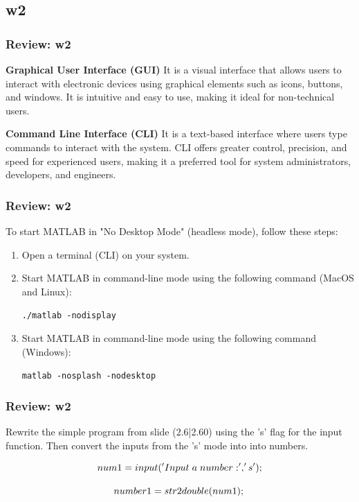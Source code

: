 \documentclass[
	11pt, %
]{beamer}
\begin{document}

\subsection{w2}

\begin{frame}
	\frametitle{Review: w2}

\textbf{Graphical User Interface (GUI)}
It is a visual interface that allows users to interact with electronic devices using graphical elements such as icons, buttons, and windows. It is intuitive and easy to use, making it ideal for non-technical users.

\textbf{Command Line Interface (CLI)}
It is a text-based interface where users type commands to interact with the system. CLI offers greater control, precision, and speed for experienced users, making it a preferred tool for system administrators, developers, and engineers.

\end{frame}

\begin{frame}
	\frametitle{Review: w2}

	To start MATLAB in "No Desktop Mode" (headless mode), follow these steps:

	\begin{enumerate}
	    \item Open a terminal (CLI) on your system.
	    \item Start MATLAB in command-line mode using the following command (MacOS and Linux):
	    
	    \texttt{./matlab -nodisplay}
	    
	    \item Start MATLAB in command-line mode using the following command (Windows):
	    
	    \texttt{matlab -nosplash -nodesktop}
	\end{enumerate}

\end{frame}


\begin{frame}
	\frametitle{Review: w2}

	Rewrite the simple program from slide (2.6|2.60) using the 's' flag for the input function. Then convert the inputs from the 's' mode into into numbers.

\vspace{1.5cm}
\[
        num1 = input('Input \hspace{0.1cm} a \hspace{0.1cm} number: ','s');
\]

\[
        number1 = str2double(num1); \\
\]

\end{frame}
\end{document}

